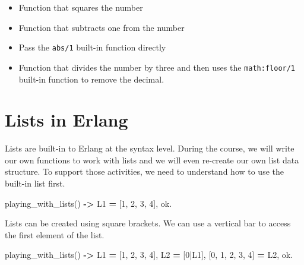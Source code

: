 \documentclass[
]{book}
\newenvironment{Shaded}{\begin{snugshade}}{\end{snugshade}}
\newcommand{\CharTok}[1]{\textcolor[rgb]{0.31,0.60,0.02}{#1}}
\newcommand{\DecValTok}[1]{\textcolor[rgb]{0.00,0.00,0.81}{#1}}
\newcommand{\FunctionTok}[1]{\textcolor[rgb]{0.00,0.00,0.00}{#1}}
\newcommand{\OperatorTok}[1]{\textcolor[rgb]{0.81,0.36,0.00}{\textbf{#1}}}
\newcommand{\VariableTok}[1]{\textcolor[rgb]{0.00,0.00,0.00}{#1}}
\providecommand{\tightlist}{%
  \setlength{\itemsep}{0pt}\setlength{\parskip}{0pt}}
\begin{document}
\begin{problembox}
\begin{enumerate}
  \begin{itemize}
  \tightlist
  \item
    Function that squares the number
  \item
    Function that subtracts one from the number
  \item
    Pass the \texttt{abs/1} built-in function directly
  \item
    Function that divides the number by three and then uses the \texttt{math:floor/1} built-in function to remove the decimal.
  \end{itemize}
\end{enumerate}

\end{problembox}

\hypertarget{lists-in-erlang}{%
\section{Lists in Erlang}\label{lists-in-erlang}}

Lists are built-in to Erlang at the syntax level. During the course, we will write our own functions to work with lists and we will even re-create our own list data structure. To support those activities, we need to understand how to use the built-in list first.

\begin{Shaded}
\begin{Highlighting}[]
\FunctionTok{playing\_with\_lists()} \OperatorTok{{-}\textgreater{}}
   \VariableTok{L1} \OperatorTok{=} \FunctionTok{[}\DecValTok{1}\FunctionTok{,} \DecValTok{2}\FunctionTok{,} \DecValTok{3}\FunctionTok{,} \DecValTok{4}\FunctionTok{],}
   \CharTok{ok}\FunctionTok{.}
\end{Highlighting}
\end{Shaded}

Lists can be created using square brackets. We can use a vertical bar to access the first element of the list.

\begin{Shaded}
\begin{Highlighting}[]
\FunctionTok{playing\_with\_lists()} \OperatorTok{{-}\textgreater{}}
   \VariableTok{L1} \OperatorTok{=} \FunctionTok{[}\DecValTok{1}\FunctionTok{,} \DecValTok{2}\FunctionTok{,} \DecValTok{3}\FunctionTok{,} \DecValTok{4}\FunctionTok{],}
   \VariableTok{L2} \OperatorTok{=} \FunctionTok{[}\DecValTok{0}\FunctionTok{|}\VariableTok{L1}\FunctionTok{],}
   \FunctionTok{[}\DecValTok{0}\FunctionTok{,} \DecValTok{1}\FunctionTok{,} \DecValTok{2}\FunctionTok{,} \DecValTok{3}\FunctionTok{,} \DecValTok{4}\FunctionTok{]} \OperatorTok{=} \VariableTok{L2}\FunctionTok{,}
   \CharTok{ok}\FunctionTok{.}
\end{Highlighting}
\end{Shaded}
\end{document}
